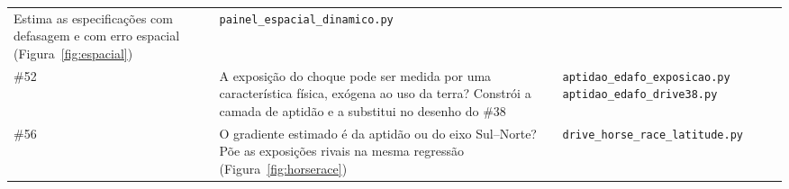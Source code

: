 \begin{quadro}[!ht]
\begin{tabular}{p{1.3cm}p{6.1cm}p{5.8cm}}
Estima as especificações com defasagem e com erro espacial
(Figura~\ref{fig:espacial}) &
\texttt{painel\_espacial\_dinamico.py} \\
\addlinespace
\#52 & A exposição do choque pode ser medida por uma característica física,
exógena ao uso da terra? Constrói a camada de aptidão e a substitui no
desenho do \#38 &
\texttt{aptidao\_edafo\_exposicao.py}
\newline \texttt{aptidao\_edafo\_drive38.py} \\
\addlinespace
\#56 & O gradiente estimado é da aptidão ou do eixo Sul--Norte? Põe as
exposições rivais na mesma regressão
(Figura~\ref{fig:horserace}) &
\texttt{drive\_horse\_race\_latitude.py} \\
\bottomrule
\end{tabular}
\end{quadro}
